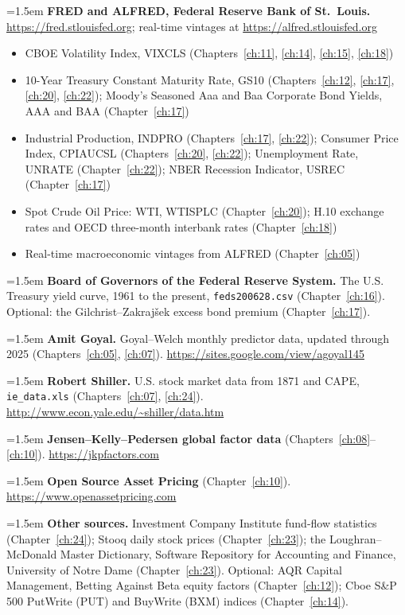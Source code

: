 \hangindent=1.5em \textbf{FRED and ALFRED, Federal Reserve Bank of St.\ Louis.} \url{https://fred.stlouisfed.org}; real-time vintages at \url{https://alfred.stlouisfed.org}
\begin{itemize}\setlength{\itemsep}{0pt}\setlength{\parskip}{0pt}
  \item CBOE Volatility Index, VIXCLS (Chapters~\ref{ch:11}, \ref{ch:14}, \ref{ch:15}, \ref{ch:18})
  \item 10-Year Treasury Constant Maturity Rate, GS10 (Chapters~\ref{ch:12}, \ref{ch:17}, \ref{ch:20}, \ref{ch:22}); Moody's Seasoned Aaa and Baa Corporate Bond Yields, AAA and BAA (Chapter~\ref{ch:17})
  \item Industrial Production, INDPRO (Chapters~\ref{ch:17}, \ref{ch:22}); Consumer Price Index, CPIAUCSL (Chapters~\ref{ch:20}, \ref{ch:22}); Unemployment Rate, UNRATE (Chapter~\ref{ch:22}); NBER Recession Indicator, USREC (Chapter~\ref{ch:17})
  \item Spot Crude Oil Price: WTI, WTISPLC (Chapter~\ref{ch:20}); H.10 exchange rates and OECD three-month interbank rates (Chapter~\ref{ch:18})
  \item Real-time macroeconomic vintages from ALFRED (Chapter~\ref{ch:05})
\end{itemize}

\hangindent=1.5em \textbf{Board of Governors of the Federal Reserve System.} The U.S. Treasury yield curve, 1961 to the present, \texttt{feds200628.csv} (Chapter~\ref{ch:16}). Optional: the Gilchrist--Zakraj\v{s}ek excess bond premium (Chapter~\ref{ch:17}).

\hangindent=1.5em \textbf{Amit Goyal.} Goyal--Welch monthly predictor data, updated through 2025 (Chapters~\ref{ch:05}, \ref{ch:07}). \url{https://sites.google.com/view/agoyal145}

\hangindent=1.5em \textbf{Robert Shiller.} U.S. stock market data from 1871 and CAPE, \texttt{ie\_data.xls} (Chapters~\ref{ch:07}, \ref{ch:24}). \url{http://www.econ.yale.edu/~shiller/data.htm}

\hangindent=1.5em \textbf{Jensen--Kelly--Pedersen global factor data} (Chapters~\ref{ch:08}--\ref{ch:10}). \url{https://jkpfactors.com}

\hangindent=1.5em \textbf{Open Source Asset Pricing} (Chapter~\ref{ch:10}). \url{https://www.openassetpricing.com}

\hangindent=1.5em \textbf{Other sources.} Investment Company Institute fund-flow statistics (Chapter~\ref{ch:24}); Stooq daily stock prices (Chapter~\ref{ch:23}); the Loughran--McDonald Master Dictionary, Software Repository for Accounting and Finance, University of Notre Dame (Chapter~\ref{ch:23}). Optional: AQR Capital Management, Betting Against Beta equity factors (Chapter~\ref{ch:12}); Cboe S\&P 500 PutWrite (PUT) and BuyWrite (BXM) indices (Chapter~\ref{ch:14}).

\endgroup
